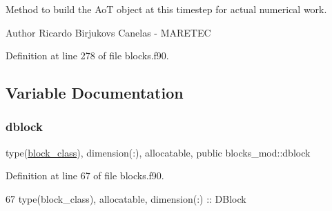 Method to build the AoT object at this timestep for actual numerical work. 

\begin{DoxyAuthor}{Author}
Ricardo Birjukovs Canelas -\/ M\+A\+R\+E\+T\+EC 
\end{DoxyAuthor}


Definition at line 278 of file blocks.\+f90.




\subsection{Variable Documentation}
\mbox{\label{namespaceblocks__mod_ac8ad6e3cf7a812f95dadb592336aca50}} 
\subsubsection{\texorpdfstring{dblock}{dblock}}
{\footnotesize\ttfamily type(\mbox{\hyperlink{structblocks__mod_1_1block__class}{block\+\_\+class}}), dimension(\+:), allocatable, public blocks\+\_\+mod\+::dblock}



Definition at line 67 of file blocks.\+f90.


\begin{DoxyCode}
67     \textcolor{keywordtype}{type}(block\_class), \textcolor{keywordtype}{allocatable}, \textcolor{keywordtype}{dimension(:)} :: DBlock
\end{DoxyCode}
